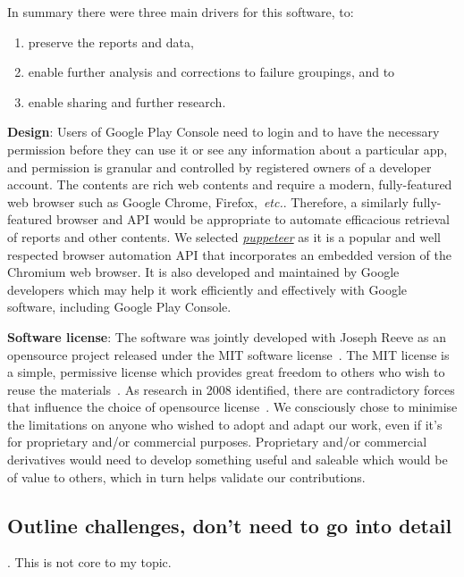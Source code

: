 In summary there were three main drivers for this software, to:
\begin{enumerate}
    \item preserve the reports and data,
    \item enable further analysis and corrections to failure groupings, and to
    \item enable sharing and further research.
\end{enumerate}

\textbf{Design}:
Users of Google Play Console need to login and to have the necessary permission before they can use it or see any information about a particular app, and permission is granular and controlled by registered owners of a developer account. The contents are rich web contents and require a modern, fully-featured web browser such as Google Chrome, Firefox,~\emph{etc.}. Therefore, a similarly fully-featured browser and API would be appropriate to automate efficacious retrieval of reports and other contents. We selected \href{https://developers.google.com/web/tools/puppeteer}{\emph{puppeteer}} as it is a popular and well respected browser automation API that incorporates an embedded version of the Chromium web browser. It is also developed and maintained by Google developers which may help it work efficiently and effectively with Google software, including Google Play Console.

\textbf{Software license}: The software was jointly developed with Joseph Reeve as an opensource project released under the MIT software license~\citep{mitlicense2020_ongithub}. The MIT license is a simple, permissive license which provides great freedom to others who wish to reuse the materials~\citep{chooseanopensourcelicense2020}. As research in 2008 identified, there are contradictory forces that influence the choice of opensource license~\citep{sen2008_determinants_for_foss_license}. We consciously chose to minimise the limitations on anyone who wished to adopt and adapt our work, even if it's for proprietary and/or commercial purposes. Proprietary and/or commercial derivatives would need to develop something useful and saleable which would be of value to others, which in turn helps validate our contributions.  

\subsection{Outline challenges, don't need to go into detail}.
This is not core to my topic. 

